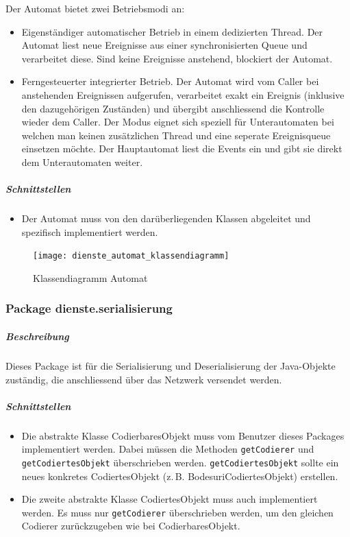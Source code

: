 \documentclass[12pt,halfparskip]{scrartcl}
\begin{document}
Der Automat bietet zwei Betriebsmodi an:
\begin{itemize}
	\item Eigenständiger automatischer Betrieb in einem dedizierten Thread. Der Automat liest neue Ereignisse aus einer synchronisierten Queue und verarbeitet diese. Sind keine Ereignisse anstehend, blockiert der Automat.
	\item Ferngesteuerter integrierter Betrieb. Der Automat wird vom Caller bei anstehenden Ereignissen aufgerufen, verarbeitet exakt ein Ereignis (inklusive den dazugehörigen Zuständen) und übergibt anschliessend die Kontrolle wieder dem Caller. Der Modus eignet sich speziell für Unterautomaten bei welchen man keinen zusätzlichen Thread und eine seperate Ereignisqueue einsetzen möchte. Der Hauptautomat liest die Events ein und gibt sie direkt dem Unterautomaten weiter. 
\end{itemize}

\subparagraph{Schnittstellen}
\begin{itemize}
	\item Der Automat muss von den darüberliegenden Klassen abgeleitet und spezifisch implementiert werden.
\end{itemize}	

\begin{figure}[h]
	\centering
	\texttt{[image: dienste\_automat\_klassendiagramm]}
	\caption{Klassendiagramm Automat}
	\label{fig:dienste_automat_klassendiagramm}
\end{figure}

\clearpage
\subsubsection{Package dienste.serialisierung}

\subparagraph{Beschreibung}
Dieses Package ist für die Serialisierung und Deserialisierung der Java-Objekte zuständig, die anschliessend über das Netzwerk versendet werden.

\subparagraph{Schnittstellen}
\begin{itemize}
	\item Die abstrakte Klasse CodierbaresObjekt muss vom Benutzer dieses Packages implementiert werden. Dabei müssen die Methoden \texttt{getCodierer} und \texttt{getCodiertesObjekt} überschrieben werden. \texttt{getCodiertesObjekt} sollte ein neues konkretes CodiertesObjekt (z.\,B. BodesuriCodiertesObjekt) erstellen.
	\item Die zweite abstrakte Klasse CodiertesObjekt muss auch implementiert werden. Es muss nur \texttt{getCodierer} überschrieben werden, um den gleichen Codierer zurückzugeben wie bei CodierbaresObjekt.
\end{itemize}
\end{document}
